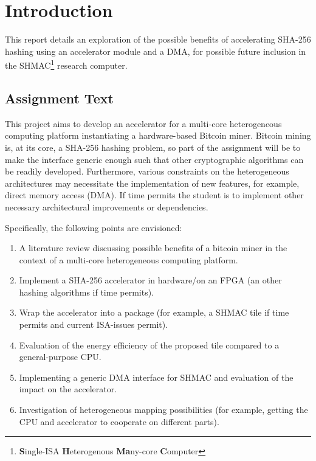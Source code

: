 \chapter{Introduction}

This report details an exploration of the possible benefits of accelerating
SHA-256 hashing using an accelerator module and a DMA, for possible future
inclusion in the SHMAC\footnote{\textbf{S}ingle-ISA \textbf{H}eterogenous
\textbf{Ma}ny-core \textbf{C}omputer} research computer.

\section{Assignment Text}

This project aims to develop an accelerator for a multi-core heterogeneous
computing platform instantiating a hardware-based Bitcoin miner. Bitcoin mining
is, at its core, a SHA-256 hashing problem, so part of the assignment will be to
make the interface generic enough such that other cryptographic algorithms can
be readily developed. Furthermore, various constraints on the heterogeneous
architectures may necessitate the implementation of new features, for example,
direct memory access (DMA). If time permits the student is to implement other
necessary architectural improvements or dependencies.

Specifically, the following points are envisioned:

\begin{enumerate}
\item A literature review discussing possible benefits of a bitcoin miner in the
      context of a multi-core heterogeneous computing platform.
\item Implement a SHA-256 accelerator in hardware/on an FPGA (an other hashing algorithms if time permits).
\item Wrap the accelerator into a package (for example, a SHMAC tile if time permits and current ISA-issues permit).
\item Evaluation of the energy efficiency of the proposed tile compared to a general-purpose CPU.
\item Implementing a generic DMA interface for SHMAC and evaluation of the impact on the accelerator.
\item Investigation of heterogeneous mapping possibilities (for example, getting the CPU and accelerator to cooperate on different parts).
\end{enumerate}

